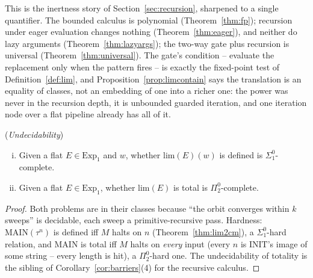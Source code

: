 This is the inertness story of Section~\ref{sec:recursion}, sharpened
to a single quantifier. The bounded calculus is polynomial
(Theorem~\ref{thm:fp}); recursion under eager evaluation changes
nothing (Theorem~\ref{thm:eager}), and neither do lazy arguments
(Theorem~\ref{thm:lazyargs}); the two-way gate plus recursion is
universal (Theorem~\ref{thm:universal}). The gate's condition --
evaluate the replacement only when the pattern fires -- is exactly the
fixed-point test of Definition~\ref{def:lim}, and
Proposition~\ref{prop:limcontain} says the translation is an
equality of classes, not an embedding of one into a richer one: the
power was never in the recursion depth, it is unbounded guarded
iteration, and one iteration node over a flat pipeline already has
all of it.

\begin{corollary}
    (\emph{Undecidability})
    \label{cor:limundec}
    \begin{enumerate}[(i)]
        \item Given a flat $E \in \mathrm{Exp}_1$ and $w$, whether
        $\mathrm{lim}(E)(w)$ is defined is $\Sigma^0_1$-complete.
        \item Given a flat $E \in \mathrm{Exp}_1$, whether
        $\mathrm{lim}(E)$ is total is $\Pi^0_2$-complete.
    \end{enumerate}
\end{corollary}

\begin{proof}
    Both problems are in their classes because ``the orbit converges
    within $k$ sweeps'' is decidable, each sweep a primitive-recursive
    pass. Hardness: $\mathrm{MAIN}(\tau^{n})$ is defined iff $M$ halts
    on $n$ (Theorem~\ref{thm:lim2cm}), a $\Sigma^0_1$-hard relation,
    and $\mathrm{MAIN}$ is total iff $M$ halts on \emph{every} input
    (every $n$ is $\mathrm{INIT}$'s image of some string -- every
    length is hit), a $\Pi^0_2$-hard one. The undecidability of
    totality is the sibling of Corollary~\ref{cor:barriers}(4) for the
    recursive calculus.
\end{proof}

